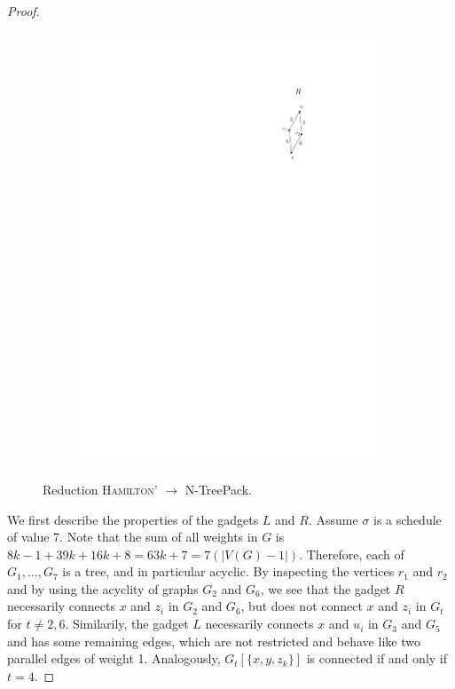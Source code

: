 \documentclass[runningheads]{llncs}
\newcommand{\set}[1]{\{ #1 \}}
\newcommand{\xxxNTP}{{\sc N-TreePack}}
\begin{document}
\begin{proof}
\begin{figure}[htpb]
\begin{subfigure}[b]{0.15\textwidth}
         \includegraphics[scale=0.90]{img/act-hamilton-cycle-c}
         \label{fig:act-hamilton-cycle-c}
     \end{subfigure}
        \caption{Reduction \textsc{Hamilton'} $\rightarrow$ {\xxxNTP}.}
        \label{fig_act_hamilton_cycle}
\end{figure}

We first describe the properties of the gadgets $L$ and $R$. Assume $\sigma$ is a schedule of value 7. Note that the sum of all weights in $G$ is $8k - 1 + 39k + 16k + 8 = 63k + 7 = 7(|V(G) - 1|)$. Therefore, each of $G_{1}, \ldots, G_{7}$ is a tree, and in particular acyclic. By inspecting the vertices $r_1$ and $r_2$ and by using the acyclity of graphs $G_2$ and $G_6$, we see that the gadget $R$ necessarily connects $x$ and $z_i$ in $G_2$ and $G_6$, but does not connect $x$ and $z_i$ in $G_t$ for $t \neq 2,6$. Similarily, the gadget $L$ necessarily connects $x$ and $u_i$ in $G_3$ and $G_5$ and has some remaining edges, which are not restricted and behave like two parallel edges of weight 1. Analogously, $G_{t}[\set{x, y, z_k}]$ is connected if and only if $t = 4$.


\end{proof}
\end{document}
